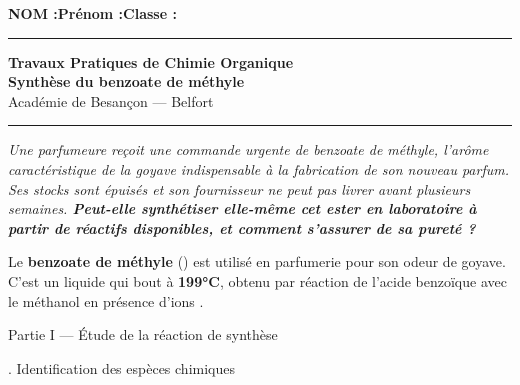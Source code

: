 \documentclass[11pt,a4paper]{article}
\newcommand{\sectitle}[1]{%
  \vspace{6pt}
  \noindent\colorbox{exoheader}{\parbox{\dimexpr\linewidth-2\fboxsep}%
    {\color{white}\bfseries\large\strut\quad #1}}
  \vspace{4pt}
}
\newcommand{\subsectitle}[1]{%
  \vspace{4pt}
  \noindent\colorbox{exolight}{\parbox{\dimexpr\linewidth-2\fboxsep}%
    {\color{exoheader}\bfseries\strut\quad #1}}
  \vspace{2pt}
}
\begin{document}
\noindent\textbf{NOM :}\hfill\textbf{Prénom :}\hfill\textbf{Classe :}\hfill\phantom{x}\\[0.2cm]
\hrule
\vspace{0.2cm}

\begin{center}
  {\large\bfseries\textcolor{exoheader}{Travaux Pratiques de Chimie Organique}}\\[4pt]
  {\LARGE\bfseries Synthèse du benzoate de méthyle}\\[2pt]
  {\small Académie de Besançon — Belfort}
\end{center}
\hrule
\vspace{6pt}

\begin{tcolorbox}[
  enhanced,
  colback=problemebg,
  colframe=exoheader,
  boxrule=1.5pt,
  title={\faFlask\quad Problématique},
  fonttitle=\bfseries\color{white},
  attach boxed title to top left={yshift=-2mm, xshift=4mm},
  boxed title style={colback=exoheader, colframe=exoheader}
]
\textit{Une parfumeure reçoit une commande urgente de benzoate de méthyle, l'arôme
caractéristique de la goyave indispensable à la fabrication de son nouveau parfum.
Ses stocks sont épuisés et son fournisseur ne peut pas livrer avant plusieurs semaines.
\textbf{Peut-elle synthétiser elle-même cet ester en laboratoire à partir de réactifs
disponibles, et comment s'assurer de sa pureté ?}}
\end{tcolorbox}

\vspace{4pt}
\begin{mdframed}[backgroundcolor=exolight, linecolor=exoheader, linewidth=1.2pt]
Le \textbf{benzoate de méthyle} () est utilisé en parfumerie pour son odeur de
goyave. C'est un liquide qui bout à \textbf{199°C}, obtenu par réaction de l'acide benzoïque
avec le méthanol en présence d'ions .
\end{mdframed}

\vspace{6pt}

\sectitle{Partie I — Étude de la réaction de synthèse}

\subsectitle{1. Identification des espèces chimiques}
\end{document}
